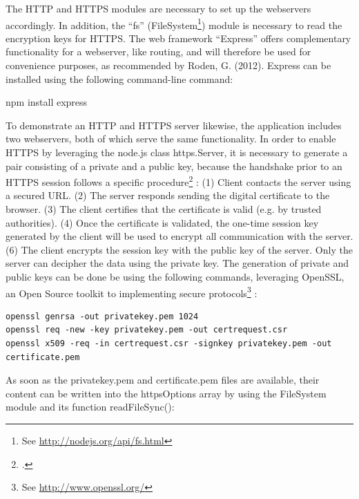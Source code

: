 


The HTTP and HTTPS modules are necessary to set up the webservers accordingly. 
In addition, the “fs” (FileSystem\footnote{See \url{ http://nodejs.org/api/fs.html}}) module is necessary to read the encryption keys for HTTPS.
 The web framework “Express” offers complementary functionality for a webserver, like routing, 
and will therefore be used for convenience purposes, as recommended by Roden, G. (2012). 
Express can be installed using the following command-line command:

npm install express 

To demonstrate an HTTP and HTTPS server likewise, the application includes two webservers, 
both of which serve the same functionality. In order to enable HTTPS by leveraging 
the node.js class https.Server, it is necessary to generate a pair consisting of a private 
and a public key, because the handshake prior to an HTTPS session follows a specific procedure\footcite[Cf.]{Nemati_2011} :
 (1) Client contacts the server using a secured URL.
 (2) The server responds sending the digital certificate to the browser.
 (3) The client certifies that the certificate is valid (e.g. by trusted authorities).
 (4) Once the certificate is validated, the one-time session key generated by the client will be used to encrypt all communication with the server.
 (6) The client encrypts the session key with the public key of the server. Only the server can decipher the data using the private key.
The generation of private and public keys can be done be using the following commands, leveraging OpenSSL, an Open Source toolkit to implementing secure protocols\footnote{See \url{ http://www.openssl.org/}} :

\begin{lstlisting}[caption={Generating a new pair of public/private keys}]
openssl genrsa -out privatekey.pem 1024
openssl req -new -key privatekey.pem -out certrequest.csr 
openssl x509 -req -in certrequest.csr -signkey privatekey.pem -out certificate.pem
\end{lstlisting}
As soon as the privatekey.pem and certificate.pem files are available, their content can be written into the httpsOptions array by using the FileSystem module and its function readFileSync():




